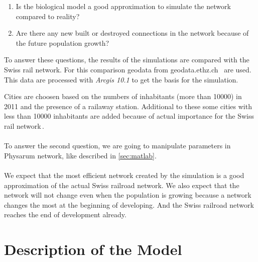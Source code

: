 \documentclass[11pt]{scrartcl}
\begin{document}
\begin{enumerate}
	\item Is the biological model a good approximation to simulate the network compared to reality?
	\item Are there any new built or destroyed connections in the network because of the future population growth?
\end{enumerate}

To answer these questions, the results of the simulations are compared with the Swiss rail network. For this comparison geodata from geodata.ethz.ch~\cite{gis_data} are used. This data are processed with \textit{Arcgis 10.1} to get the basis for the simulation.

Cities are choosen based on the numbers of inhabitants (more than 10000) in 2011 and the presence of a railaway station. Additional to these some cities with less than 10000 inhabitants are added because of actual importance for the Swiss rail network\,\cite{bfs}. ~\\
~\\
To answer the second question, we are going to manipulate parameters in Physarum network, like described  in \ref{sec:matlab}.\\
~\\
We expect that the most efficient network created by the simulation is a good approximation of the actual Swiss railroad network. We also expect that the network will not change even when the population is growing because a network changes the most at the beginning of developing. And the Swiss railroad network reaches the end of development already.




\section{Description of the Model}
\label{sec:description}
\end{document}
